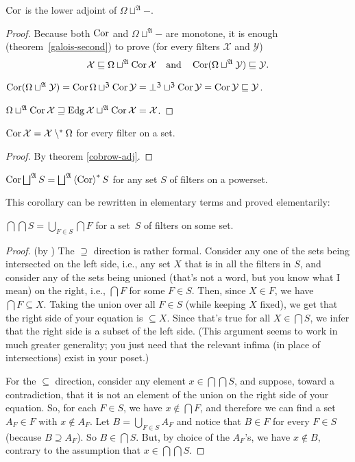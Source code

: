 \begin{thm}
$\operatorname{Cor}$ is the lower adjoint of $\Omega\sqcup^{\mathfrak{A}}\mathord-$.\end{thm}
\begin{proof}
Because both $\operatorname{Cor}$ and $\Omega\sqcup^{\mathfrak{A}}\mathord-$ are
monotone, it is enough (theorem~\ref{galois-second}) to prove (for
every filters $\mathcal{X}$ and $\mathcal{Y}$)
\[
\mathcal{X}\sqsubseteq\Omega\sqcup^{\mathfrak{A}}\operatorname{Cor}\mathcal{X}\quad\text{and}\quad\operatorname{Cor}(\Omega\sqcup^{\mathfrak{A}}\mathcal{Y})\sqsubseteq\mathcal{Y}.
\]

$\operatorname{Cor}(\Omega\sqcup^{\mathfrak{A}}\mathcal{Y})=\operatorname{Cor}\Omega\sqcup^{\mathfrak{Z}}\operatorname{Cor}\mathcal{Y}=\bot^{\mathfrak{Z}}\sqcup^{\mathfrak{Z}}\operatorname{Cor}\mathcal{Y}=\operatorname{Cor}\mathcal{Y}\sqsubseteq\mathcal{Y}$.

$\Omega\sqcup^{\mathfrak{A}}\operatorname{Cor}\mathcal{X}\sqsupseteq\operatorname{Edg}\mathcal{X}\sqcup^{\mathfrak{A}}\operatorname{Cor}\mathcal{X}=\mathcal{X}$.
\end{proof}
\begin{cor}
$\operatorname{Cor}\mathcal{X}=\mathcal{X}\setminus^{\ast}\Omega$ for every filter on
a set.\end{cor}
\begin{proof}
By theorem \ref{cobrow-adj}.\end{proof}
\begin{cor}
$\Cor\bigsqcup^{\mathfrak{A}}S=\bigsqcup^{\mathfrak{A}}\rsupfun{\Cor}S$
for any set $S$ of filters on a powerset.
\end{cor}
This corollary can be rewritten in elementary terms and proved elementarily:
\begin{prop}
$\bigcap\bigcap S=\bigcup_{F\in S}\bigcap F$ for a set~$S$ of filters
on some set.\end{prop}
\begin{proof}
(by ) The $\supseteq$ direction is rather formal.
Consider any one of the sets being intersected on the left side, i.e.,
any set $X$ that is in all the filters in $S$, and consider any
of the sets being unioned (that's not a word, but you know what I
mean) on the right, i.e., $\bigcap F$ for some $F\in S$. Then, since
$X\in F$, we have $\bigcap F\subseteq X$. Taking the union over
all $F\in S$ (while keeping $X$ fixed), we get that the right side
of your equation is $\subseteq X$. Since that's true for all $X\in\bigcap S$,
we infer that the right side is a subset of the left side. (This argument
seems to work in much greater generality; you just need that the relevant
infima (in place of intersections) exist in your poset.)

For the $\subseteq$ direction, consider any element $x\in\bigcap\bigcap S$,
and suppose, toward a contradiction, that it is not an element of
the union on the right side of your equation. So, for each $F\in S$,
we have $x\notin\bigcap F$, and therefore we can find a set $A_{F}\in F$
with $x\notin A_{F}$. Let $B=\bigcup_{F\in S}A_{F}$ and notice that
$B\in F$ for every $F\in S$ (because $B\supseteq A_{F}$). So $B\in\bigcap S$.
But, by choice of the $A_{F}$'s, we have $x\notin B$, contrary to
the assumption that $x\in\bigcap\bigcap S$.\end{proof}

